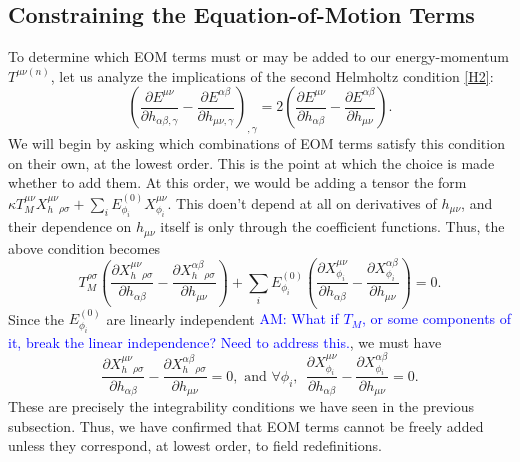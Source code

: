 \documentclass[aps,physrev,preprint,groupedaddress]{revtex4-2}
\newcommand{\AM}[1]{\textcolor{blue}{AM: #1}}
\begin{document}
\subsection{Constraining the Equation-of-Motion Terms}
To determine which EOM terms must or may be added to our energy-momentum \(T^{\mu\nu(n)}\), let us analyze the implications of the second Helmholtz condition \eqref{H2}:
\begin{equation}\label{H2copy}
{\left(\frac{\partial E^{\mu\nu}}{\partial h_{\alpha\beta,\gamma}}-\frac{\partial E^{\alpha\beta}}{\partial h_{\mu\nu,\gamma}}\right)}_{,\gamma}=2\left(\frac{\partial E^{\mu\nu}}{\partial h_{\alpha\beta}}-\frac{\partial E^{\alpha\beta}}{\partial h_{\mu\nu}}\right).
\end{equation}
We will begin by asking which combinations of EOM terms satisfy this condition on their own, at the lowest order. This is the point at which the choice is made whether to add them. At this order, we would be adding a tensor the form \(\kappa T^{\mu\nu}_MX_h^{\mu\nu}{}_{\rho\sigma}+\sum_iE_{\phi_i}^{(0)}X_{\phi_i}^{\mu\nu}\). This doen't depend at all on derivatives of \(h_{\mu\nu}\), and their dependence on \(h_{\mu\nu}\) itself is only through the coefficient functions. Thus, the above condition becomes 
\begin{equation}
T^{\rho\sigma}_M\left(\frac{\partial X_h^{\mu\nu}{}_{\rho\sigma}}{\partial h_{\alpha\beta}}-\frac{\partial X_h^{\alpha\beta}{}_{\rho\sigma}}{\partial h_{\mu\nu}}\right)+\sum_iE_{\phi_i}^{(0)}\left(\frac{\partial X_{\phi_i}^{\mu\nu}}{\partial h_{\alpha\beta}}-\frac{\partial X_{\phi_i}^{\alpha\beta}}{\partial h_{\mu\nu}}\right)=0.
\end{equation}
Since the \(E_{\phi_i}^{(0)}\) are linearly independent \AM{What if \(T_M\), or some components of it, break the linear independence? Need to address this.}, we must have 
\begin{equation}
\frac{\partial X_h^{\mu\nu}{}_{\rho\sigma}}{\partial h_{\alpha\beta}}-\frac{\partial X_h^{\alpha\beta}{}_{\rho\sigma}}{\partial h_{\mu\nu}}=0,\text{ and }\forall\phi_i,\ \ \frac{\partial X_{\phi_i}^{\mu\nu}}{\partial h_{\alpha\beta}}-\frac{\partial X_{\phi_i}^{\alpha\beta}}{\partial h_{\mu\nu}}=0.
\end{equation}
These are precisely the integrability conditions we have seen in the previous subsection. Thus, we have confirmed that EOM terms cannot be freely added unless they correspond, at lowest order, to field redefinitions. 
\end{document}
